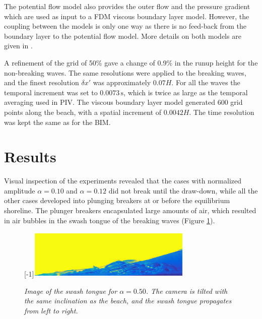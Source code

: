 \documentclass[review, authoryear]{elsarticle}
\newcommand{\s}{\,\mbox{s}}
\begin{document}
The potential flow model also provides the outer flow and the pressure gradient
which are used as input to a FDM viscous boundary layer model. However, the coupling between the
models is only one way as there is no feed-back from the boundary layer to the potential
flow model. 
More details on both models are given in \cite{pedersen2013runup}. 

A refinement of the grid of 50\% gave a change of 0.9\% in the runup height for the non-breaking waves. The same resolutions were applied to the breaking waves, and the finest resolution $\delta x'$ was approximately $0.07H$.  For all the waves the temporal increment was set to $0.0073\s$, which is twice as large as the temporal averaging used in PIV. The viscous boundary layer model generated 600 grid points along the beach, with a spatial increment of $0.0042H$. The time resolution was kept the same as for the BIM.


\section{Results}
\label{result}

Visual inspection of the experiments revealed that the cases with normalized amplitude $\alpha=0.10$ and $\alpha=0.12$ did not break until the draw-down, while all the other cases developed into plunging breakers at or before the equilibrium shoreline. The plunger breakers encapsulated large amounts of air, which resulted in air bubbles in the swash tongue of the breaking waves (Figure \ref{fig:boble_bevis}).

\begin{figure}[]
\centering
\scalebox{1}[-1]{\includegraphics[angle=180,width=0.7\textwidth]{./Figures/BUBBLE/new_jan_bilde_bub.eps}}
\caption{\textit{Image of the swash tongue for $\alpha=0.50$. The camera is tilted with the same inclination as the beach, and the swash tongue propagates from left to right.}}
\label{fig:boble_bevis}
\end{figure}
\end{document}
